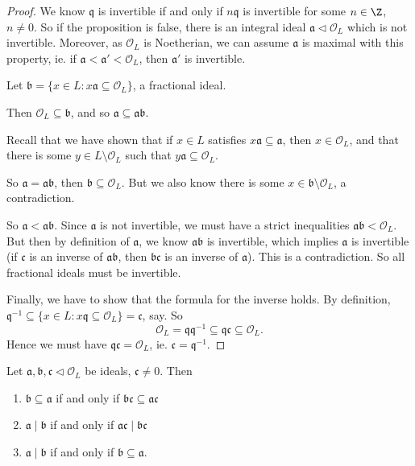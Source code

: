 \documentclass[a4paper]{article}
\begin{document}
\begin{proof}
  We know $\mathfrak{q}$ is invertible if and only if $n\mathfrak{q}$ is invertible for some $n \in \Z$, $n \not= 0$. So if the proposition is false, there is an integral ideal $\mathfrak{a} \lhd \mathcal{O}_L$ which is not invertible. Moreover, as $\mathcal{O}_L$ is Noetherian, we can assume $\mathfrak{a}$ is maximal with this property, ie. if $\mathfrak{a} < \mathfrak{a}' < \mathcal{O}_L$, then $\mathfrak{a}'$ is invertible.

  Let $\mathfrak{b} = \{x \in L: x \mathfrak{a} \subseteq \mathcal{O}_L\}$, a fractional ideal.

  Then $\mathcal{O}_L \subseteq \mathfrak{b}$, and so $\mathfrak{a} \subseteq \mathfrak{a} \mathfrak{b}$.

  Recall that we have shown that if $x \in L$ satisfies $x\mathfrak{a} \subseteq \mathfrak{a}$, then $x \in \mathcal{O}_L$, and that there is some $y \in L \setminus \mathcal{O}_L$ such that $y\mathfrak{a} \subseteq \mathcal{O}_L$.

  So $\mathfrak{a} = \mathfrak{a}\mathfrak{b}$, then $\mathfrak{b} \subseteq \mathcal{O}_L$. But we also know there is some $x \in \mathfrak{b} \setminus \mathcal{O}_L$, a contradiction.

  So $\mathfrak{a} < \mathfrak{a} \mathfrak{b}$. Since $\mathfrak{a}$ is not invertible, we must have a strict inequalities $\mathfrak{a}\mathfrak{b} < \mathcal{O}_L$. But then by definition of $\mathfrak{a}$, we know $\mathfrak{a}\mathfrak{b}$ is invertible, which implies $\mathfrak{a}$ is invertible (if $\mathfrak{c}$ is an inverse of $\mathfrak{a}\mathfrak{b}$, then $\mathfrak{b}\mathfrak{c}$ is an inverse of $\mathfrak{a}$). This is a contradiction. So all fractional ideals must be invertible.

  Finally, we have to show that the formula for the inverse holds. By definition, $\mathfrak{q}^{-1} \subseteq \{x \in L: x\mathfrak{q} \subseteq \mathcal{O}_L \} = \mathfrak{c}$, say. So
  \[
    \mathcal{O}_L = \mathfrak{q}\mathfrak{q}^{-1}\subseteq \mathfrak{q} \mathfrak{c} \subseteq \mathcal{O}_L.
  \]
  Hence we must have $\mathfrak{q}\mathfrak{c} = \mathcal{O}_L$, ie. $\mathfrak{c} = \mathfrak{q}^{-1}$.
\end{proof}

\begin{cor}
  Let $\mathfrak{a}, \mathfrak{b}, \mathfrak{c}\lhd \mathcal{O}_L$ be ideals, $\mathfrak{c} \not= 0$. Then
  \begin{enumerate}
    \item $\mathfrak{b} \subseteq \mathfrak{a}$ if and only if $\mathfrak{b}\mathfrak{c} \subseteq \mathfrak{a}\mathfrak{c}$
    \item $\mathfrak{a} \mid \mathfrak{b}$ if and only if $\mathfrak{a} \mathfrak{c} \mid \mathfrak{b}\mathfrak{c}$
    \item $\mathfrak{a} \mid \mathfrak{b}$ if and only if $\mathfrak{b} \subseteq \mathfrak{a}$.
  \end{enumerate}
\end{cor}
\end{document}
